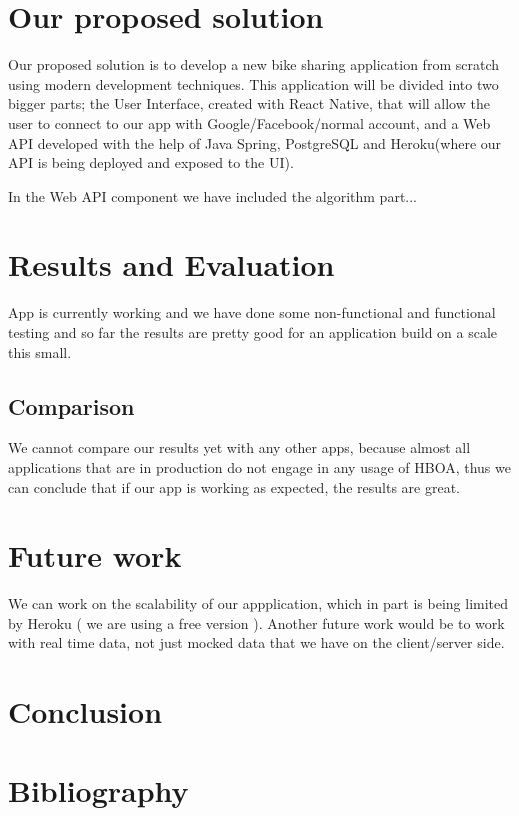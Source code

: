 \documentclass[12pt]{article}
\begin{document}
\section{Our proposed solution}

Our proposed solution is to develop a new bike sharing application from scratch using modern development techniques. This application will be divided into two bigger parts; the User Interface, created with React Native, that will allow the user to connect to our app with Google/Facebook/normal account, and a Web API developed with the help of Java Spring, PostgreSQL and Heroku(where our API is being deployed and exposed to the UI).

In the Web API component we have included the algorithm part...

\section{Results and Evaluation}

App is currently working and we have done some non-functional and functional testing and so far the results are pretty good for an application build on a scale this small.

\subsection{Comparison}

We cannot compare our results yet with any other apps, because almost all applications that are in production do not engage in any usage of HBOA, thus we can conclude that if our app is working as expected, the results are great.

\section{Future work}

We can work on the scalability of our appplication, which in part is being limited by Heroku ( we are using a free version ). Another future work would be to work with real time data, not just mocked data that we have on the client/server side.

\section{Conclusion}

\section{Bibliography}
\end{document}
